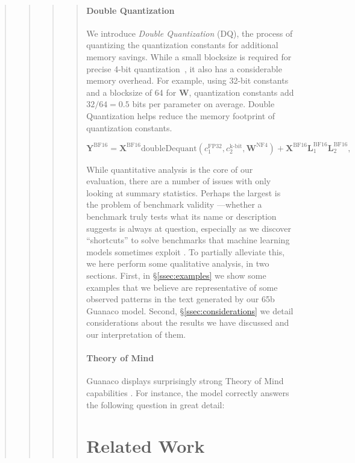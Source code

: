 \begin{quote}
\begin{quote}
\begin{quote}
\begin{quote}
\paragraph{Double Quantization{}} 
We introduce \emph{Double Quantization} (DQ), the process of quantizing the quantization constants for additional memory savings. While a small blocksize is required for precise 4-bit quantization~\citep{dettmers2022case}, it also has a considerable memory overhead. For example, using 32-bit constants and a blocksize of 64 for $\mathbf{W}$, quantization constants add $32/64 = 0.5$ bits per parameter on average. Double Quantization helps reduce the memory footprint of quantization constants.

\begin{equation}
    \mathbf{Y}^{\text{BF16}} =  \mathbf{X}^{\text{BF16}} \text{doubleDequant}(c_1^{\text{FP32}}, c_2^{\text{k-bit}}, \mathbf{W}^{\text{NF4}}) + \mathbf{X}^{\text{BF16}}\mathbf{L}^{\text{BF16}}_1\mathbf{L}^{\text{BF16}}_2,
\end{equation}

While quantitative analysis is the core of our evaluation, there are a number of issues with only looking at summary statistics. Perhaps the largest is the problem of benchmark validity \citep{liao2021we}—whether a benchmark truly tests what its name or description suggests is always at question, especially as we discover ``shortcuts'' to solve benchmarks that machine learning models sometimes exploit \citep{gururangan2018annotation, poliak2018hypothesis}. To partially alleviate this, we here perform some qualitative analysis, in two sections. First, in \S\ref{ssec:examples} we show some examples that we believe are representative of some observed patterns in the text generated by our 65b {Guanaco} model. Second, \S\ref{ssec:considerations} we detail considerations about the results we have discussed and our interpretation of them.

\paragraph{Theory of Mind} {Guanaco} displays surprisingly strong Theory of Mind capabilities \cite{nematzadeh2018evaluating, sap2022neural}. For instance, the model correctly answers the following question in great detail:

\section{Related Work}


\end{quote}
\end{quote}
\end{quote}
\end{quote}
